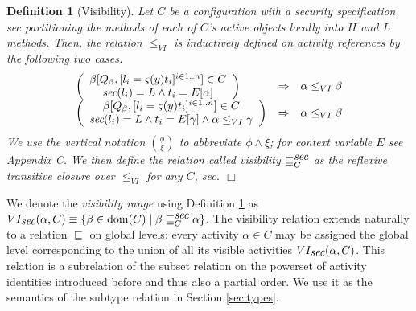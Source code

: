 \documentclass[10pt, conference, compsocconf]{IEEEtran}
\newcommand{\symb}[1]{\makebox{\it #1}}
\newcommand\dom{{\rm dom}}
\newtheorem{definition}{Definition}[section]
\begin{document}
{\begin{definition}[Visibility]
\label{def:vis}
Let $C$ be a configuration with a security specification
{\it sec} partitioning the methods of each of $C$'s active objects locally into $H$ and $L$
methods.
Then, the relation $\leq_{VI}$ is inductively defined on activity references by the following two cases.
\[
\begin{array}{lcl}
  \left(\begin{array}{c}
\beta[Q_\beta, [l_i = \varsigma(y) t_i]^{i\in 1..n}] \in C \\
    \symb{sec}(l_i) = L \wedge t_i = E[\alpha] 
  \end{array}\right)
& \Rightarrow & \alpha \leq_{VI} \beta\\
   \left(\begin{array}{c}
\beta[Q_\beta, [l_i = \varsigma(y) t_i]^{i\in 1..n}] \in C\\
     \symb{sec}(l_i) = L \wedge t_i = E[\gamma] \wedge \alpha \leq_{VI} \gamma 
   \end{array}\right)
& \Rightarrow & \alpha \leq_{VI} \beta
\end{array}
\]
We use the vertical notation $\phi \choose \xi$ to abbreviate $\phi \wedge \xi$; 
for context variable $E$ see Appendix C.
We then define the relation called {\em visibility} $\sqsubseteq_C^{{\symb{sec}}}$ 
as the {\it reflexive transitive closure} over $\leq_{VI}$ for any $C$, {\it sec}. \hfill$\Box$
\end{definition}
We denote the {\it visibility range} using Definition \ref{def:vis} as
$VI_{\symb{sec}}(\alpha,C) \equiv \{ \beta \in \dom(C) \mid \beta \sqsubseteq_C^{{\symb{sec}}} \alpha \}$.
The visibility relation
extends naturally to a relation $\sqsubseteq$ on global levels: every activity $\alpha \in C$
may be assigned the global level corresponding to the union of all its visible activities
$VI_{\symb{sec}}(\alpha,C)$.
This relation is a subrelation of the subset relation on the powerset of activity identities
introduced before and thus also a partial order. 
We use it as the semantics of the subtype relation in Section \ref{sec:types}.

}
\end{document}
